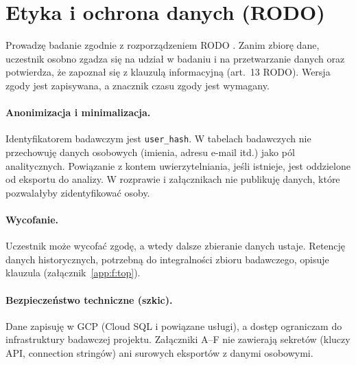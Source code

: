\section{Etyka i ochrona danych (RODO)}
\label{ch06:sec:etyka}

Prowadzę badanie zgodnie z rozporządzeniem RODO \parencite{eu2016gdpr}. Zanim zbiorę dane, uczestnik osobno zgadza się na udział w badaniu i na przetwarzanie danych oraz potwierdza, że zapoznał się z klauzulą informacyjną (art.~13 RODO). Wersja zgody jest zapisywana, a znacznik czasu zgody jest wymagany.

\paragraph{Anonimizacja i minimalizacja.}
Identyfikatorem badawczym jest \texttt{user\_hash}. W tabelach badawczych nie przechowuję danych osobowych (imienia, adresu e-mail itd.) jako pól analitycznych. Powiązanie z kontem uwierzytelniania, jeśli istnieje, jest oddzielone od eksportu do analizy. W rozprawie i załącznikach nie publikuję danych, które pozwalałyby zidentyfikować osoby.

\paragraph{Wycofanie.}
Uczestnik może wycofać zgodę, a wtedy dalsze zbieranie danych ustaje. Retencję danych historycznych, potrzebną do integralności zbioru badawczego, opisuje klauzula (załącznik~\ref{app:f:top}).

\paragraph{Bezpieczeństwo techniczne (szkic).}
Dane zapisuję w GCP (Cloud SQL i powiązane usługi), a dostęp ograniczam do infrastruktury badawczej projektu. Załączniki A--F nie zawierają sekretów (kluczy API, connection stringów) ani surowych eksportów z danymi osobowymi.
